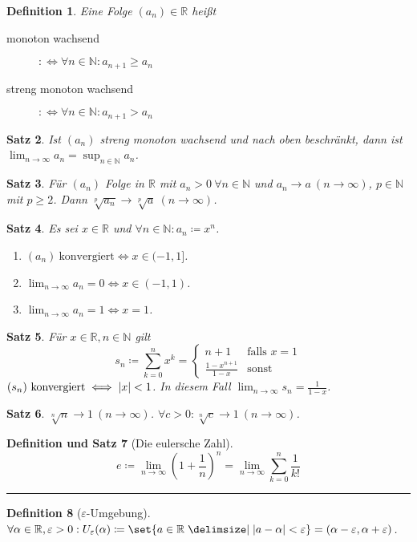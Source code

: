 \documentclass[a4paper]{article}
\newcounter{Sec}
\theoremstyle{marginbreak}
\newtheorem{definition}{Definition}[Sec]
\newtheorem{satz}[definition]{Satz}
\newtheorem{defsatz}[definition]{Definition und Satz}
\newcommand{\sep}{%
	\rule{\textwidth}{0.3pt}%
	\stepcounter{Sec}%
	}
\newcommand{\defiff}{:\Longleftrightarrow}
\newcommand{\en}{~(n\to\infty)}
\begin{document}
	\begin{definition}
		Eine Folge $(a_n)\in\mathbb{R}$ heißt
		\begin{description}
			\item[monoton wachsend] $\defiff\forall n\in\mathbb{N}:a_{n+1}\geq a_n$
			\item[streng monoton wachsend] $\defiff\forall n\in\mathbb{N}:a_{n+1}>a_n$
		\end{description}
	\end{definition}
	\begin{satz}
		Ist $(a_n)$ streng monoton wachsend und nach oben beschränkt, dann ist $\lim_{n\to\infty} a_n=\sup_{n\in\mathbb{N}}a_n$.
	\end{satz}
	\begin{satz}
		Für $(a_n)$ Folge in $\mathbb{R}$ mit $a_n>0~\forall n\in\mathbb{N}$ und $a_n\to a\en$,
		$p\in\mathbb{N}$ mit $p\geq2$. Dann $\sqrt[p]{a_n}\to\sqrt[p]{a}\en$.
	\end{satz}
	\begin{satz}
		Es sei $x\in\mathbb{R}$ und $\forall n\in\mathbb{N}:a_n\coloneqq x^n$.
		\begin{enumerate}[label=(\alph*)]
			\item $(a_n)~\text{konvergiert}\iff x\in(-1,1]$.
			\item $\lim_{n\to\infty}a_n=0\iff x\in(-1,1)$.
			\item $\lim_{n\to\infty}a_n=1\iff x =1$.
		\end{enumerate}
	\end{satz}
	\begin{satz}
		Für $x\in\mathbb{R},n\in\mathbb{N}$ gilt \[s_n\coloneqq\sum_{k=0}^nx^k=\begin{cases}
			n+1 &\text{falls $x=1$}\\
			\frac{1-x^{n+1}}{1-x} &\text{sonst}
		\end{cases}\]
		$(s_n)~\text{konvergiert}\iff\abs{x}<1$. In diesem Fall $\lim_{n\to\infty}s_n=\frac{1}{1-x}$.
	\end{satz}
	\begin{satz}
		$\sqrt[n]{n}\to1\en$. $\forall c>0:\sqrt[n]{c}\to1\en$.
	\end{satz}
	\begin{defsatz}[Die eulersche Zahl]
		\[ e\coloneqq \lim_{n\to\infty}(1+\frac{1}{n})^n = \lim_{n\to\infty}\sum_{k=0}^n\frac{1}{k!}\]
	\end{defsatz}
	\sep
	\begin{definition}[$\varepsilon$-Umgebung]
		$\forall\alpha\in\mathbb{R},\varepsilon>0:U_\varepsilon(\alpha)\coloneqq\set{a\in\mathbb{R}\given\abs{a-\alpha}<\varepsilon}
		=(\alpha-\varepsilon,\alpha+\varepsilon)$.
	\end{definition}
\end{document}
